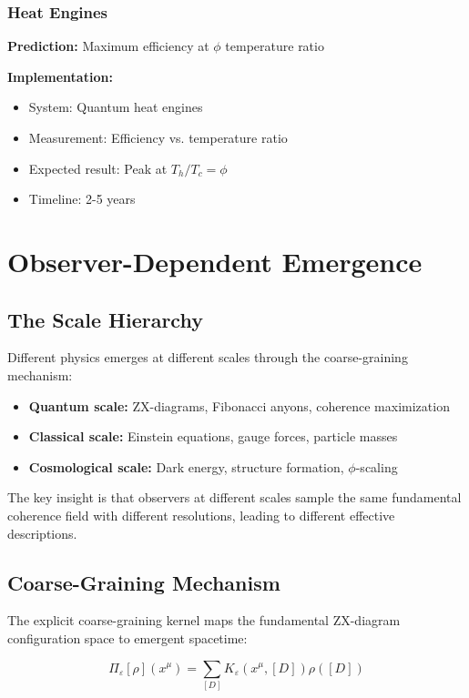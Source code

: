 \documentclass[11pt]{article}
\theoremstyle{definition}
\newcommand{\goldenratio}{\phi}
\newcommand{\density}{\rho}
\begin{document}
\subsubsection{Heat Engines}

\textbf{Prediction:} Maximum efficiency at $\goldenratio$ temperature ratio

\textbf{Implementation:}
\begin{itemize}
\item System: Quantum heat engines
\item Measurement: Efficiency vs. temperature ratio
\item Expected result: Peak at $T_h/T_c = \goldenratio$
\item Timeline: 2-5 years
\end{itemize}

\section{Observer-Dependent Emergence}

\subsection{The Scale Hierarchy}

Different physics emerges at different scales through the coarse-graining mechanism:

\begin{itemize}
\item \textbf{Quantum scale:} ZX-diagrams, Fibonacci anyons, coherence maximization
\item \textbf{Classical scale:} Einstein equations, gauge forces, particle masses
\item \textbf{Cosmological scale:} Dark energy, structure formation, $\goldenratio$-scaling
\end{itemize}

The key insight is that observers at different scales sample the same fundamental coherence field with different resolutions, leading to different effective descriptions.

\subsection{Coarse-Graining Mechanism}

The explicit coarse-graining kernel maps the fundamental ZX-diagram configuration space to emergent spacetime:

\begin{equation}
\Pi_\varepsilon[\density](x^\mu) = \sum_{[D]} K_\varepsilon(x^\mu, [D]) \density([D])
\end{equation}
\end{document}
